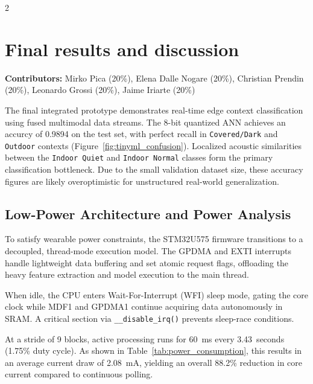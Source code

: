 \documentclass[10pt]{article}
\begin{document}
\begin{multicols}{2}
\section{Final results and discussion}
\noindent\textbf{Contributors:} Mirko Pica (20\%), Elena Dalle Nogare (20\%), Christian Prendin (20\%), Leonardo Grossi (20\%), Jaime Iriarte (20\%)
\vspace{0.1cm}

The final integrated prototype demonstrates real-time edge context classification using fused multimodal data streams. The 8-bit quantized ANN achieves an accurcy of 0.9894 on the test set, with perfect recall in \texttt{Covered/Dark} and \texttt{Outdoor} contexts (Figure~\ref{fig:tinyml_confusion}). Localized acoustic similarities between the \texttt{Indoor Quiet} and \texttt{Indoor Normal} classes form the primary classification bottleneck. Due to the small validation dataset size, these accuracy figures are likely overoptimistic for unstructured real-world generalization.

\subsection{Low-Power Architecture and Power Analysis}
To satisfy wearable power constraints, the STM32U575 firmware transitions to a decoupled, thread-mode execution model. The GPDMA and EXTI interrupts handle lightweight data buffering and set atomic request flags, offloading the heavy feature extraction and model execution to the main thread. 

When idle, the CPU enters Wait-For-Interrupt (WFI) sleep mode, gating the core clock while MDF1 and GPDMA1 continue acquiring data autonomously in SRAM. A critical section via \texttt{\_\_disable\_irq()} prevents sleep-race conditions. 

At a stride of 9 blocks, active processing runs for 60~ms every 3.43~seconds (1.75\% duty cycle). As shown in Table~\ref{tab:power_consumption}, this results in an average current draw of 2.08~mA, yielding an overall 88.2\% reduction in core current compared to continuous polling.


\end{multicols}
\end{document}
